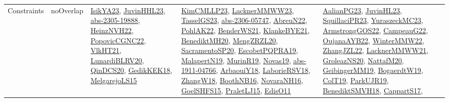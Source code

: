 {\begin{longtable}{lp{3cm}>{\raggedright}p{6cm}>{\raggedright}p{6cm}p{8cm}}
Constraints & noOverlap & \href{articles/IsikYA23.pdf}{IsikYA23}\cite{IsikYA23}, \href{papers/JuvinHHL23.pdf}{JuvinHHL23}\cite{JuvinHHL23}, \href{articles/abs-2305-19888.pdf}{abs-2305-19888}\cite{abs-2305-19888}, \href{articles/HeinzNVH22.pdf}{HeinzNVH22}\cite{HeinzNVH22}, \href{papers/PopovicCGNC22.pdf}{PopovicCGNC22}\cite{PopovicCGNC22}, \href{articles/VlkHT21.pdf}{VlkHT21}\cite{VlkHT21}, \href{articles/LunardiBLRV20.pdf}{LunardiBLRV20}\cite{LunardiBLRV20}, \href{articles/QinDCS20.pdf}{QinDCS20}\cite{QinDCS20}, \href{articles/GedikKEK18.pdf}{GedikKEK18}\cite{GedikKEK18}, \href{papers/MelgarejoLS15.pdf}{MelgarejoLS15}\cite{MelgarejoLS15} & \href{papers/KimCMLLP23.pdf}{KimCMLLP23}\cite{KimCMLLP23}, \href{articles/LacknerMMWW23.pdf}{LacknerMMWW23}\cite{LacknerMMWW23}, \href{papers/TasselGS23.pdf}{TasselGS23}\cite{TasselGS23}, \href{articles/abs-2306-05747.pdf}{abs-2306-05747}\cite{abs-2306-05747}, \href{articles/AbreuN22.pdf}{AbreuN22}\cite{AbreuN22}, \href{articles/PohlAK22.pdf}{PohlAK22}\cite{PohlAK22}, \href{papers/BenderWS21.pdf}{BenderWS21}\cite{BenderWS21}, \href{papers/KlankeBYE21.pdf}{KlankeBYE21}\cite{KlankeBYE21}, \href{articles/BenediktMH20.pdf}{BenediktMH20}\cite{BenediktMH20}, \href{articles/MengZRZL20.pdf}{MengZRZL20}\cite{MengZRZL20}, \href{articles/SacramentoSP20.pdf}{SacramentoSP20}\cite{SacramentoSP20}, \href{articles/EscobetPQPRA19.pdf}{EscobetPQPRA19}\cite{EscobetPQPRA19}, \href{papers/MalapertN19.pdf}{MalapertN19}\cite{MalapertN19}, \href{papers/MurinR19.pdf}{MurinR19}\cite{MurinR19}, \href{articles/Novas19.pdf}{Novas19}\cite{Novas19}, \href{articles/abs-1911-04766.pdf}{abs-1911-04766}\cite{abs-1911-04766}, \href{papers/ArbaouiY18.pdf}{ArbaouiY18}\cite{ArbaouiY18}, \href{articles/LaborieRSV18.pdf}{LaborieRSV18}\cite{LaborieRSV18}, \href{articles/ZhangW18.pdf}{ZhangW18}\cite{ZhangW18}, \href{papers/BoothNB16.pdf}{BoothNB16}\cite{BoothNB16}, \href{articles/NovaraNH16.pdf}{NovaraNH16}\cite{NovaraNH16}, \href{articles/GoelSHFS15.pdf}{GoelSHFS15}\cite{GoelSHFS15}, \href{papers/PraletLJ15.pdf}{PraletLJ15}\cite{PraletLJ15}, \href{papers/EdisO11.pdf}{EdisO11}\cite{EdisO11} & \href{papers/AalianPG23.pdf}{AalianPG23}\cite{AalianPG23}, \href{papers/JuvinHL23.pdf}{JuvinHL23}\cite{JuvinHL23}, \href{papers/SquillaciPR23.pdf}{SquillaciPR23}\cite{SquillaciPR23}, \href{papers/YuraszeckMC23.pdf}{YuraszeckMC23}\cite{YuraszeckMC23}, \href{papers/ArmstrongGOS22.pdf}{ArmstrongGOS22}\cite{ArmstrongGOS22}, \href{articles/CampeauG22.pdf}{CampeauG22}\cite{CampeauG22}, \href{papers/OujanaAYB22.pdf}{OujanaAYB22}\cite{OujanaAYB22}, \href{papers/WinterMMW22.pdf}{WinterMMW22}\cite{WinterMMW22}, \href{papers/ZhangJZL22.pdf}{ZhangJZL22}\cite{ZhangJZL22}, \href{papers/LacknerMMWW21.pdf}{LacknerMMWW21}\cite{LacknerMMWW21}, \href{papers/GroleazNS20.pdf}{GroleazNS20}\cite{GroleazNS20}, \href{papers/NattafM20.pdf}{NattafM20}\cite{NattafM20}, \href{papers/GeibingerMM19.pdf}{GeibingerMM19}\cite{GeibingerMM19}, \href{papers/BogaerdtW19.pdf}{BogaerdtW19}\cite{BogaerdtW19}, \href{papers/ColT19.pdf}{ColT19}\cite{ColT19}, \href{papers/ParkUJR19.pdf}{ParkUJR19}\cite{ParkUJR19}, \href{papers/BenediktSMVH18.pdf}{BenediktSMVH18}\cite{BenediktSMVH18}, \href{papers/CappartS17.pdf}{CappartS17}\cite{CappartS17}, 
\end{longtable}}
